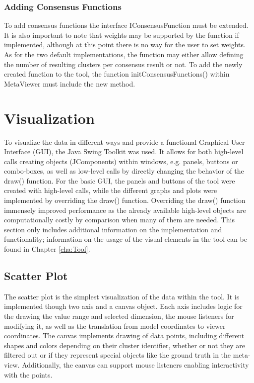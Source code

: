 \documentclass[
	a4paper,
	english,
	twoside,
	openright,               
	11pt                            
	]{report}
\begin{document}
\subsubsection*{Adding Consensus Functions}
To add consensus functions the interface IConsensusFunction must be extended. It is also important to note that weights may be supported by the function if implemented, although at this point there is no way for the user to set weights. As for the two default implementations, the function may either allow defining the number of resulting clusters per consensus result or not. To add the newly created function to the tool, the function initConsensusFunctions() within MetaViewer must include the new method.

\section{Visualization}

To visualize the data in different ways and provide a functional Graphical User Interface (GUI), the Java Swing \cite{javaswing} Toolkit was used. It allows for both high-level calls creating objects (JComponents) within windows, e.g. panels, buttons or combo-boxes, as well as low-level calls by directly changing the behavior of the draw() function. For the basic GUI, the panels and buttons of the tool were created with high-level calls, while the different graphs and plots were implemented by overriding the draw() function. Overriding the draw() function immensely improved performance as the already available high-level objects are computationally costly by comparison when many of them are needed. This section only includes additional information on the implementation and functionality; information on the usage of the visual elements in the tool can be found in Chapter \ref{cha:Tool}.

\subsection{Scatter Plot}
The scatter plot is the simplest visualization of the data within the tool. It is implemented though two axis and a canvas object. Each axis includes logic for the drawing the value range and selected dimension, the mouse listeners for modifying it, as well as the translation from model coordinates to viewer coordinates. The canvas implements drawing of data points, including different shapes and colors depending on their cluster identifier, whether or not they are filtered out or if they represent special objects like the ground truth in the meta-view. Additionally, the canvas can support mouse listeners enabling interactivity with the points.
\end{document}
